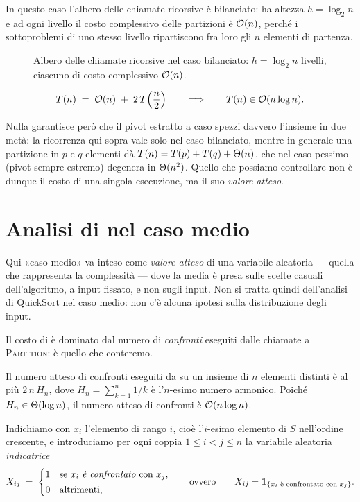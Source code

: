 In questo caso l'albero delle chiamate ricorsive è bilanciato: ha altezza
$h=\log_2 n$ e ad ogni livello il costo complessivo delle partizioni è
$\mathcal{O}(n)$, perché i sottoproblemi di uno stesso livello ripartiscono fra loro gli
$n$ elementi di partenza.

\begin{figure}[H]
  \centering
  
  \caption{Albero delle chiamate ricorsive nel caso bilanciato: $h=\log_2 n$
  livelli, ciascuno di costo complessivo $\mathcal{O}(n)$.}
  \label{fig:randqs-albero-chiamate}
\end{figure}

\[
  T(n) \;=\; \mathcal{O}(n) \;+\; 2\,T\!\left(\frac{n}{2}\right)
  \qquad\Longrightarrow\qquad
  T(n) \in \mathcal{O}(n\log n).
\]

Nulla garantisce però che il pivot estratto a caso spezzi davvero l'insieme in
due metà: la ricorrenza qui sopra vale solo nel caso bilanciato, mentre in
generale una partizione in $p$ e $q$ elementi dà $T(n)=T(p)+T(q)+\Theta(n)$, che
nel caso pessimo (pivot sempre estremo) degenera in $\Theta(n^2)$. Quello che
possiamo controllare non è dunque il costo di una singola esecuzione, ma il suo
\emph{valore atteso}.

\section{Analisi di \texorpdfstring{\RandQS}{RandQS} nel caso medio}
\label{sec:randqs-analisi}

Qui «caso medio» va inteso come \emph{valore atteso} di una variabile aleatoria
--- quella che rappresenta la complessità --- dove la media è presa sulle scelte
casuali dell'algoritmo, a input fissato, e non sugli input. Non si tratta quindi
dell'analisi di QuickSort nel caso medio: non c'è alcuna ipotesi sulla
distribuzione degli input.

Il costo di \RandQS è dominato dal numero di \emph{confronti} eseguiti dalle
chiamate a \textsc{Partition}: è quello che conteremo.

\begin{teorema}
\label{thm:randqs-confronti}
Il numero atteso di confronti eseguiti da \RandQS su un insieme di $n$ elementi
distinti è al più $2\,n\,H_n$, dove $H_n=\sum_{k=1}^{n}1/k$ è l'$n$-esimo numero
armonico. Poiché $H_n \in \Theta(\log n)$, il numero atteso di confronti è
$\mathcal{O}(n\log n)$.
\end{teorema}

Indichiamo con $x_i$ l'elemento di rango $i$, cioè l'$i$-esimo elemento di $S$
nell'ordine crescente, e introduciamo per ogni coppia $1\le i<j\le n$ la
variabile aleatoria \emph{indicatrice}
\[
  X_{ij} \;=\;
  \begin{cases}
    1 & \text{se } x_i \text{ \emph{è confrontato} con } x_j,\\[2pt]
    0 & \text{altrimenti,}
  \end{cases}
  \qquad\text{ovvero}\qquad
  X_{ij} = \mathbf{1}_{\{x_i \text{ è confrontato con } x_j\}}.
\]

